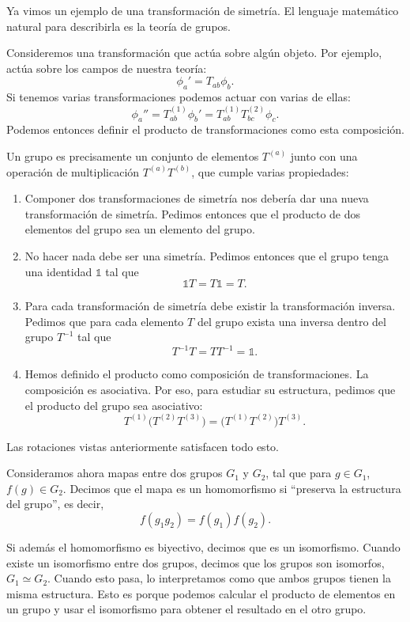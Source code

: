 \documentclass[11pt,a4paper]{article}
\newcommand{\concept}[1]{\textcolor{concept-green}{#1}}
\begin{document}
Ya vimos un ejemplo de una transformación de simetría. El lenguaje matemático natural para describirla es la teoría de grupos.

Consideremos una transformación que actúa sobre algún objeto. Por ejemplo, actúa sobre los campos de nuestra teoría:
\[
  \phi_a'=T_{ab}\phi_b.
\]
Si tenemos varias transformaciones podemos actuar con varias de ellas:
\[
  \phi_a''=T_{ab}^{(1)}\phi_b'
  =T_{ab}^{(1)}T_{bc}^{(2)}\phi_c.
\]
Podemos entonces definir el producto de transformaciones como esta composición.

Un \concept{grupo} es precisamente un conjunto de elementos $T^{(a)}$ junto con una operación de multiplicación $T^{(a)}T^{(b)}$, que cumple varias propiedades:

\begin{enumerate}[label=\arabic*.]
  \item Componer dos transformaciones de simetría nos debería dar una nueva transformación de simetría. Pedimos entonces que el producto de dos elementos del grupo sea un elemento del grupo.

  \item No hacer nada debe ser una simetría. Pedimos entonces que el grupo tenga una identidad $\mathbb{1}$ tal que
  \[
    \mathbb{1}T=T\mathbb{1}=T.
  \]

  \item Para cada transformación de simetría debe existir la transformación inversa. Pedimos que para cada elemento $T$ del grupo exista una inversa dentro del grupo $T^{-1}$ tal que
  \[
    T^{-1}T=TT^{-1}=\mathbb{1}.
  \]

  \item Hemos definido el producto como composición de transformaciones. La
  composición es asociativa. Por eso, para estudiar su estructura, pedimos que
  el producto del grupo sea asociativo:
  \[
    T^{(1)}\bigl(T^{(2)}T^{(3)}\bigr)
    =\bigl(T^{(1)}T^{(2)}\bigr)T^{(3)}.
  \]
\end{enumerate}

Las rotaciones vistas anteriormente satisfacen todo esto.

Consideramos ahora mapas entre dos grupos $G_1$ y $G_2$, tal que para $g\in G_1$, $f(g)\in G_2$. Decimos que el mapa es un \concept{homomorfismo} si ``preserva la estructura del grupo'', es decir,
\[
  f(g_1g_2)=f(g_1)f(g_2).
\]

Si además el homomorfismo es biyectivo, decimos que es un \concept{isomorfismo}. Cuando existe un isomorfismo entre dos grupos, decimos que los grupos son \concept{isomorfos}, $G_1\simeq G_2$. Cuando esto pasa, lo interpretamos como que ambos grupos tienen la misma estructura. Esto es porque podemos calcular el producto de elementos en un grupo y usar el isomorfismo para obtener el resultado en el otro grupo.
\end{document}
